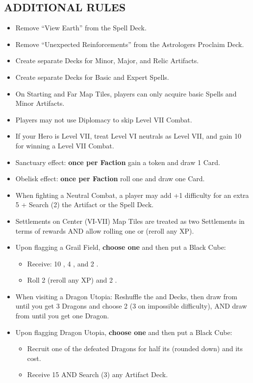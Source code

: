 \begin{multicols*}{2}
\subsection*{\MakeUppercase{Additional Rules}}
\begin{itemize}
  \item Remove ``View Earth'' from the Spell Deck.
  \item Remove ``Unexpected Reinforcements'' from the Astrologers Proclaim Deck.
  \item Create separate Decks for Minor, Major, and Relic Artifacts.
  \item Create separate Decks for Basic and Expert Spells.
  \item On Starting and Far Map Tiles, players can only acquire basic Spells and Minor Artifacts.
  \item Players may not use Diplomacy to skip Level VII Combat.
  \item If your Hero is Level VII, treat Level VI neutrals as Level VII, and gain 10  for winning a Level VII Combat.
  \item Sanctuary effect: \textbf{once per Faction} gain a  token and draw 1 Card.
  \item Obelisk effect: \textbf{once per Faction} roll one  and draw one Card.
  \item When fighting a Neutral Combat, a player may add +1 difficulty for an extra 5  + Search (2) the Artifact or the Spell Deck.
  \item Settlements on Center (VI-VII) Map Tiles are treated as two Settlements in terms of rewards AND allow rolling one  or  (reroll any XP).
  \item Upon flagging a Grail Field, \textbf{choose one} and then put a Black Cube:
  \begin{itemize}
    \item Receive: 10 , 4 , and 2 .
    \item Roll 2  (reroll any XP) and 2 .
  \end{itemize}
  \item When visiting a Dragon Utopia: Reshuffle the  and  Decks, then draw from  until you get 3 Dragons and choose 2 (3 on impossible difficulty), AND draw from  until you get one Dragon.
  \item Upon flagging Dragon Utopia, \textbf{choose one} and then put a Black Cube:
  \begin{itemize}
    \item Recruit one of the defeated Dragons for half its  (rounded down) and its  cost.
    \item Receive 15  AND Search (3) any Artifact Deck.
  \end{itemize}
\end{itemize}


\end{multicols*}
